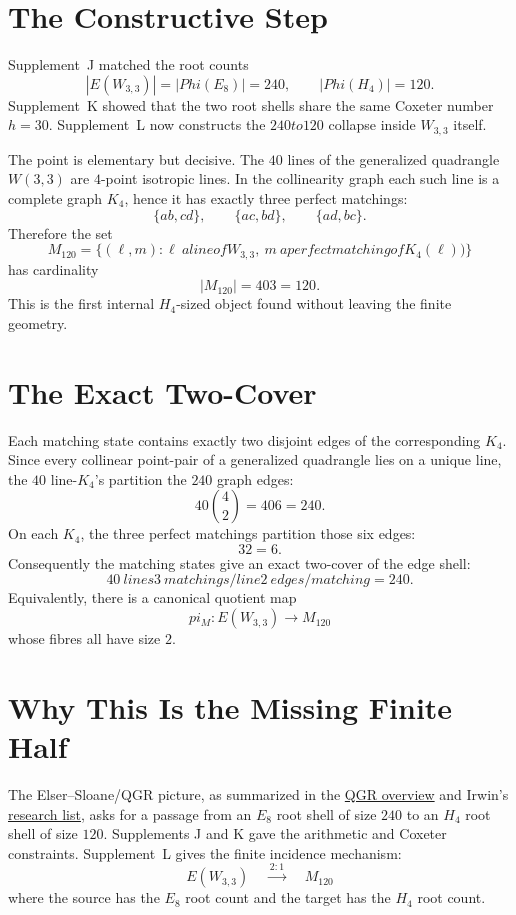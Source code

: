 \documentclass[12pt,a4paper]{article}
\def\mathcal#1{#1}%
\def\text#1{#1}%
\def\Phi#1{Phi#1}%
\def\pi{pi}%
\def\cdot{ }%
\def\to{ to }%
\theoremstyle{definition}
\begin{document}
\section*{The Constructive Step}

Supplement~J matched the root counts
\[
|E(W_{3,3})|=|\Phi(E_8)|=240,\qquad |\Phi(H_4)|=120.
\]
Supplement~K showed that the two root shells share the same Coxeter
number $h=30$. Supplement~L now constructs the $240\to 120$ collapse
inside $W_{3,3}$ itself.

The point is elementary but decisive.  The $40$ lines of the generalized
quadrangle $W(3,3)$ are $4$-point isotropic lines.  In the collinearity
graph each such line is a complete graph $K_4$, hence it has exactly
three perfect matchings:
\[
\{ab,cd\},\qquad \{ac,bd\},\qquad \{ad,bc\}.
\]
Therefore the set
\[
\mathcal{M}_{120}
=
\{(\ell,m):\ell\ \text{a line of }W_{3,3},\ m\ \text{a perfect matching of }K_4(\ell))\}
\]
has cardinality
\[
\boxed{\;|\mathcal{M}_{120}|=40\cdot 3=120.\;}
\]
This is the first internal $H_4$-sized object found without leaving the
finite geometry.

\section*{The Exact Two-Cover}

Each matching state contains exactly two disjoint edges of the
corresponding $K_4$.  Since every collinear point-pair of a generalized
quadrangle lies on a unique line, the $40$ line-$K_4$'s partition the
$240$ graph edges:
\[
40\cdot \binom{4}{2}=40\cdot 6=240.
\]
On each $K_4$, the three perfect matchings partition those six edges:
\[
3\cdot 2=6.
\]
Consequently the matching states give an exact two-cover of the edge
shell:
\[
\boxed{\;40\ \text{lines}\cdot 3\ \text{matchings/line}\cdot
2\ \text{edges/matching}=240.\;}
\]
Equivalently, there is a canonical quotient map
\[
\pi_{\mathcal{M}}:E(W_{3,3})\longrightarrow \mathcal{M}_{120}
\]
whose fibres all have size $2$.

\section*{Why This Is the Missing Finite Half}

The Elser--Sloane/QGR picture, as summarized in the
\href{https://quantumgravityresearch.org/cycle-clock-theory-overview/}{QGR overview}
and Irwin's
\href{https://kleeirwin.com/research/}{research list}, asks for a passage from an $E_8$ root
shell of size $240$ to an $H_4$ root shell of size $120$.  Supplements
J and K gave the arithmetic and Coxeter constraints. Supplement~L gives
the finite incidence mechanism:
\[
\boxed{\;E(W_{3,3})\quad \xrightarrow{\;2:1\;}\quad
\mathcal{M}_{120}\;}
\]
where the source has the $E_8$ root count and the target has the $H_4$
root count.
\end{document}
